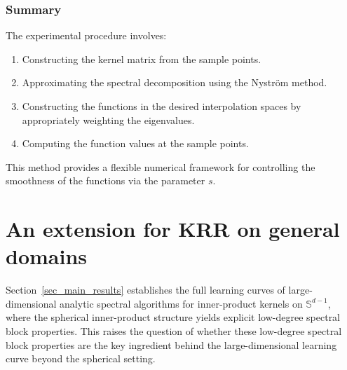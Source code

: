 \documentclass{article}
\theoremstyle{plain}
\theoremstyle{definition}
\theoremstyle{remark}
\begin{document}
\subsubsection{Summary}
The experimental procedure involves:
\begin{enumerate}
    \item Constructing the kernel matrix from the sample points.
    \item Approximating the spectral decomposition using the Nyström method.
    \item Constructing the functions in the desired interpolation spaces by appropriately weighting the eigenvalues.
    \item Computing the function values at the sample points.
\end{enumerate}
This method provides a flexible numerical framework for controlling the smoothness of the functions via the parameter $s$.











\fi









\section{An extension for KRR on general domains}
\label{sec_general}




Section~\ref{sec_main_results} establishes the full learning curves of large-dimensional analytic spectral algorithms for inner-product kernels on $\mathbb{S}^{d-1}$, where the spherical inner-product structure yields explicit low-degree spectral block properties.
This raises the question of whether these low-degree spectral block properties are the key ingredient behind the large-dimensional learning curve beyond the spherical setting.
\end{document}

